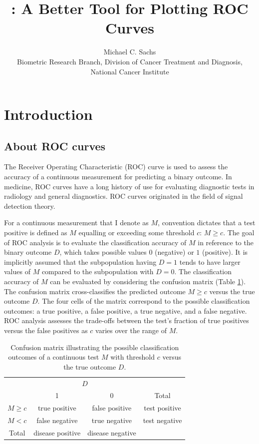 \documentclass[codesnippet]{jss}
\author{		Michael C. Sachs\\Biometric Research Branch, Division of Cancer Treatment and Diagnosis,
National Cancer Institute		}
\title{\pkg{plotROC}: A Better Tool for Plotting ROC Curves}
\begin{document}
\section{Introduction}\label{introduction}

\subsection{About ROC curves}\label{about-roc-curves}

The Receiver Operating Characteristic (ROC) curve is used to assess the
accuracy of a continuous measurement for predicting a binary outcome. In
medicine, ROC curves have a long history of use for evaluating
diagnostic tests in radiology and general diagnostics. ROC curves
originated in the field of signal detection theory.

For a continuous measurement that I denote as \(M\), convention dictates
that a test positive is defined as \(M\) equalling or exceeding some
threshold \(c\): \(M \geq c\). The goal of ROC analysis is to evaluate
the classification accuracy of \(M\) in reference to the binary outcome
\(D\), which takes possible values \(0\) (negative) or \(1\) (positive).
It is implicitly assumed that the subpopulation having \(D = 1\) tends
to have larger values of \(M\) compared to the subpopulation with
\(D = 0\). The classification accuracy of \(M\) can be evaluated by
considering the confusion matrix (Table \ref{confus}). The confusion
matrix cross-classifies the predicted outcome \(M \geq c\) versus the
true outcome \(D\). The four cells of the matrix correspond to the
possible classification outcomes: a true positive, a false positive, a
true negative, and a false negative. ROC analysis assesses the
trade-offs between the test's fraction of true positives versus the
false positives as \(c\) varies over the range of \(M\).

\begin{table}
\begin{center}
\begin{tabular}{l|c|c|c}
\multicolumn{1}{c}{}&\multicolumn{2}{c}{$D$}&\\
\cline{2-3}
\multicolumn{1}{c|}{}&1&0&\multicolumn{1}{c}{Total}\\
\cline{2-3}
 $M \geq c$ & true positive & false positive & test positive\\
\cline{2-3}
 $M < c$ & false negative & true negative & test negative\\
\cline{2-3}
\multicolumn{1}{c}{Total} & \multicolumn{1}{c}{disease positive} & \multicolumn{1}{c}{disease negative} & \multicolumn{1}{c}{}\\
\end{tabular}
\caption{\label{confus} Confusion matrix illustrating the possible classification outcomes of a continuous test $M$ with threshold $c$ versus the true outcome $D$. }
\end{center}
\end{table}
\end{document}
